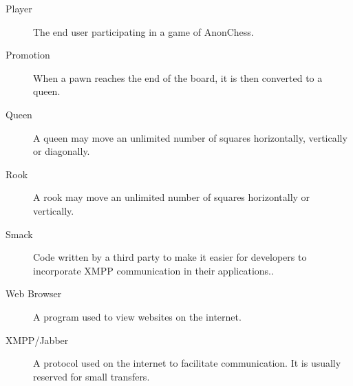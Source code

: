 \begin{description}
\item[Player] The end user participating in a game of AnonChess. 
\item[Promotion] When a pawn reaches the end of the board, it is then converted to a queen.
\item[Queen] A queen may move an unlimited number of squares horizontally, vertically or diagonally.
\item[Rook] A rook may move an unlimited number of squares horizontally or vertically.
\item[Smack] Code written by a third party to make it easier for developers to incorporate XMPP communication in their applications..
\item[Web Browser] A program used to view websites on the internet.
\item[XMPP/Jabber] A protocol used on the internet to facilitate communication. It is usually reserved for small transfers.
\end{description}
